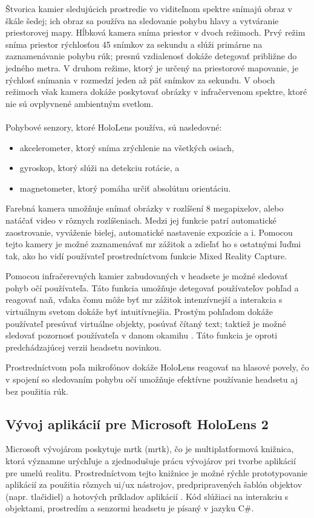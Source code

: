 Štvorica kamier sledujúcich prostredie vo viditeľnom spektre snímajú obraz v škále šedej; ich obraz sa používa na sledovanie pohybu hlavy a vytváranie priestorovej mapy.
Hĺbková kamera sníma priestor v dvoch režimoch. Prvý režim sníma priestor rýchlosťou 45 snímkov za sekundu a slúži primárne na zaznamenávanie pohybu rúk; presnú vzdialenosť
dokáže detegovať približne do jedného metra. V druhom režime, ktorý je určený na priestorové mapovanie, je rýchlosť snímania v rozmedzí jeden až päť snímkov za sekundu.
V oboch režimoch však kamera dokáže poskytovať obrázky v infračervenom spektre, ktoré nie sú ovplyvnené ambientným svetlom.
\\\\
\noindent Pohybové senzory, ktoré HoloLens používa, sú nasledovné:
\begin{itemize}
  \item akcelerometer, ktorý sníma zrýchlenie na všetkých osiach,
  \item gyroskop, ktorý slúži na detekciu rotácie, a
  \item magnetometer, ktorý pomáha určiť absolútnu orientáciu.
\end{itemize}
Farebná kamera umožňuje snímať obrázky v rozlíšení 8 megapixelov, alebo natáčať video v rôznych rozlíšeniach. Medzi jej funkcie patrí automatické zaostrovanie, vyváženie bielej,
automatické nastavenie expozície a i. Pomocou tejto kamery je možné zaznamenávať \acrshort{mr} zážitok a zdieľať ho s ostatnými ľuďmi tak, ako ho vidí používateľ 
prostredníctvom funkcie Mixed Reality Capture.

Pomocou infračerevných kamier zabudovaných v headsete je možné sledovať pohyb očí používateľa. Táto funkcia umožňuje detegovať používateľov pohľad a reagovať naň, vďaka čomu 
môže byť \acrshort{mr} zážitok intenzívnejší a interakcia s virtuálnym svetom dokáže byť intuitívnejšia. 
Prostým pohľadom dokáže používateľ presúvať virtuálne objekty, posúvať čítaný text; taktiež je možné sledovať pozornosť používateľa v danom okamihu \cite{EyeTrackingHoloLens}.
Táto funkcia je oproti predchádzajúcej verzii headsetu novinkou.

Prostredníctvom poľa mikrofónov dokáže HoloLens reagovať na hlasové povely, čo v spojení so sledovaním pohybu očí umožňuje efektívne používanie headsetu aj bez použitia rúk.

\subsection{Vývoj aplikácií pre Microsoft HoloLens 2}
Microsoft vývojárom poskytuje \acrshort{mrtk} (\acrlong{mrtk}), čo je multiplatformová knižnica, ktorá významne urýchľuje a zjednodušuje prácu vývojárov pri tvorbe aplikácií
pre umelú realitu. Prostredníctvom tejto knižnice je možné rýchle prototypovanie aplikácií za použitia rôznych \acrshort{ui}/\acrshort{ux} nástrojov, predpripravených šablón 
objektov (napr. tlačidiel) a hotových príkladov aplikácií \cite{valoremreplyWaysMicrosoftMixed}. Kód slúžiaci na interakciu s objektami, prostredím a senzormi headsetu
je písaný v jazyku C\#.

